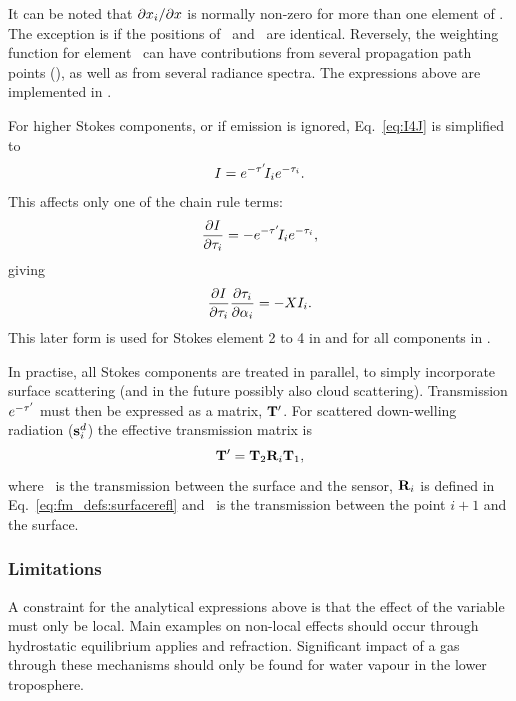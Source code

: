It can be noted that $\partial x_{i} / \partial x$ is normally non-zero
for more than one element of \SttVct. The exception is if the positions of
\ and \SttElm\ are identical. Reversely, the weighting function for
element \SttElm\ can have contributions from several propagation path points
(), as well as from several radiance spectra. The expressions above
are implemented in .

For higher Stokes components, or if emission is ignored, Eq.~\ref{eq:I4J} is
simplified to
\begin{equation}
  \label{eq:Q4J}
  I = e^{-\tau'}\!I_{i}e^{-\tau_{i}}.
\end{equation}
This affects only one of the chain rule terms:
\begin{equation}
  \frac{\partial I}{\partial\tau_{i}} 
      = -e^{-\tau'}\!I_{i}e^{-\tau_{i}},
\end{equation}
giving
\begin{equation}
  \frac{\partial I}{\partial\tau_{i}}\frac{\partial\tau_{i}}{\partial{\alpha}_{i}} =
  -X I_{i}.
\end{equation}
This later form is used for Stokes element 2 to 4 in
 and for all components in
.

In practise, all Stokes components are treated in parallel, to simply
incorporate surface scattering (and in the future possibly also cloud
scattering). Transmission $e^{-\tau'}$ must then be expressed as a matrix,
$\mathbf{T}'$. For scattered down-welling radiation (${\bf s}^d_i$) the
effective transmission matrix is
\begin{equation}
  \mathbf{T}' = \mathbf{T}_{2}\mathbf{R}_i\mathbf{T}_{1},
\end{equation}
where \ is the transmission between the surface and the sensor,
$\mathbf{R}_i$ is defined in Eq.~\ref{eq:fm_defs:surfacerefl} and
\ is the transmission between the point $i+1$ and the surface.


\subsubsection{Limitations}
%
A constraint for the analytical expressions above is that the effect of the
variable must only be local. Main examples on non-local effects should occur
through hydrostatic equilibrium applies and refraction. Significant impact of a
gas through these mechanisms should only be found for water vapour in the
lower troposphere.





